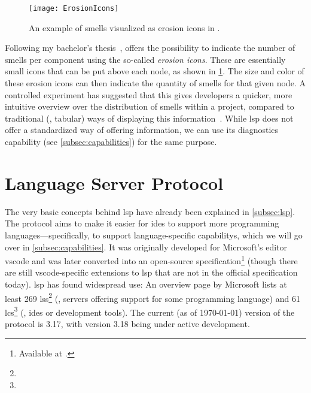 \documentclass[../thesis]{subfiles}
\begin{document}
\begin{figure}
	\begin{center}
		\texttt{[image: ErosionIcons]}
	\end{center}
	\caption{An example of \glspl{smell} visualized as erosion icons in \SEE{}.}\label{fig:erosion}
\end{figure}

Following my bachelor's thesis~\cite{galperin2021}, \SEE{} offers the possibility to indicate the number of \glspl{smell} per component using the so-called \emph{erosion icons}.
These are essentially small icons that can be put above each node, as shown in \cref{fig:erosion}.
The size and color of these erosion icons can then indicate the quantity of \glspl{smell} for that given node.
A controlled experiment has suggested that this gives developers a quicker, more intuitive overview over the distribution of \glspl{smell} within a project, compared to traditional (\ie, tabular) ways of displaying this information~\cite{galperin2022}.
While \gls{lsp} does not offer a standardized way of offering  information, we can use its diagnostics capability (see \cref{subsec:capabilities}) for the same purpose.

\section{Language Server Protocol}\label{sec:lsp}
The very basic concepts behind \gls{lsp} have already been explained in \cref{subsec:lsp}.
The protocol aims to make it easier for \glspl{ide} to support more programming languages---specifically, to support language-specific \glspl{capability}, which we will go over in \cref{subsec:capabilities}.
It was originally developed for Microsoft's editor \gls{vscode} and was later converted into an open-source specification\footnote{
	Available at .
} (though there are still \gls{vscode}-specific extensions to \gls{lsp} that are not in the official specification today).
\gls{lsp} has found widespread use:
An overview page by Microsoft lists at least 269 \glspl{ls}\footnote{} (\ie, servers offering support for some programming language) and 61 \glspl{lc}\footnote{} (\ie, \glspl{ide} or development tools).
The current (as of \today{}) version of the protocol is 3.17, with version 3.18 being under active development.
\end{document}
